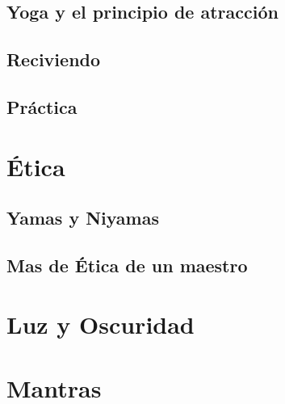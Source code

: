 \subsection{Yoga y el principio de atracción}
\subsection{Reciviendo}
\subsection{Práctica}
\section{Ética}
\subsection{Yamas y Niyamas}
\subsection{Mas de Ética de un maestro}
\section{Luz y Oscuridad}
\section{Mantras}
